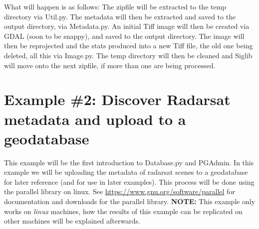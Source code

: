 \documentclass[letterpaper,10pt,openany,oneside]{sphinxmanual}
\begin{document}
What will happen is as follows: The zipfile will be extracted to the temp
directory via Util.py. The metadata will then be extracted and saved to the output
directory, via Metadata.py. An initial Tiff image will then be created via GDAL
(soon to be snappy),  and saved to the output directory. The image will then be reprojected
and the stats produced into a new Tiff file, the old one being deleted, all this via Image.py.
The temp directory will then be cleaned and Siglib will move onto the next zipfile,
if more than one are being processed.


\section{Example \#2: Discover Radarsat metadata and upload to a geodatabase}
\label{tutorial:example-2-discover-radarsat-metadata-and-upload-to-a-geodatabase}
This example will be the first introduction to Database.py and PGAdmin.
In this example we will be uploading the metadata of radarsat scenes to a
geodatabase for later reference (and for use in later examples). This process
will be done using the parallel library on linux. See \href{https://www.gnu.org/software/parallel}{https://www.gnu.org/software/parallel}
for documentation and downloads for the parallel library. \textbf{NOTE:} This example only
works on \emph{linux} machines, how the results of this example can be replicated
on other machines will be explained afterwards.
\end{document}
